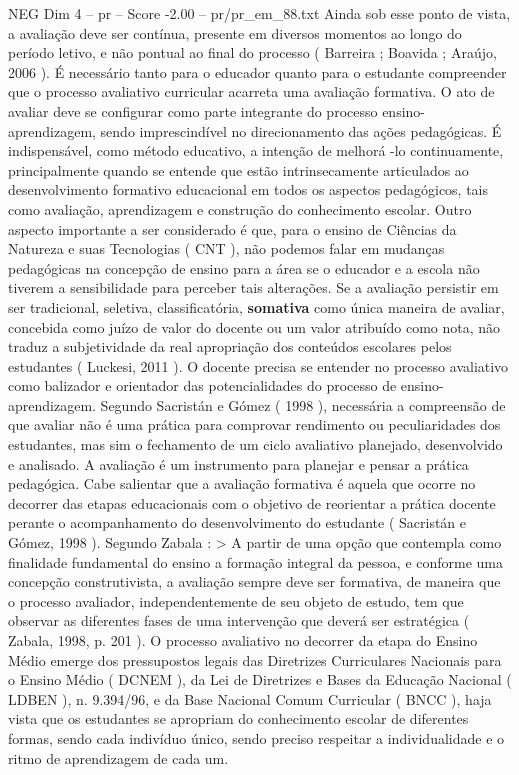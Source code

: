 \begin{textsample}{NEG Dim 4 – pr – Score -2.00 – pr/pr\_em\_88.txt}
Ainda sob esse ponto de vista, a avaliação deve ser contínua, presente em diversos momentos ao longo do período letivo, e não pontual ao final do processo ( Barreira ; Boavida ; Araújo, 2006 ).
É necessário tanto para o educador quanto para o estudante compreender que o processo avaliativo curricular acarreta uma avaliação formativa.
O ato de avaliar deve se configurar como parte integrante do processo ensino-aprendizagem, sendo imprescindível no direcionamento das ações pedagógicas.
É indispensável, como método educativo, a intenção de melhorá -lo continuamente, principalmente quando se entende que estão intrinsecamente articulados ao desenvolvimento formativo educacional em todos os aspectos pedagógicos, tais como avaliação, aprendizagem e construção do conhecimento escolar.
Outro aspecto importante a ser considerado é que, para o ensino de Ciências da Natureza e suas Tecnologias ( CNT ), não podemos falar em mudanças pedagógicas na concepção de ensino para a área se o educador e a escola não tiverem a sensibilidade para perceber tais alterações.
Se a avaliação persistir em ser tradicional, seletiva, classificatória, \textbf{somativa} como única maneira de avaliar, concebida como juízo de valor do docente ou um valor atribuído como nota, não traduz a subjetividade da real apropriação dos conteúdos escolares pelos estudantes ( Luckesi, 2011 ).
O docente precisa se entender no processo avaliativo como balizador e orientador das potencialidades do processo de ensino-aprendizagem.
Segundo Sacristán e Gómez ( 1998 ), necessária a compreensão de que avaliar não é uma prática para comprovar rendimento ou peculiaridades dos estudantes, mas sim o fechamento de um ciclo avaliativo planejado, desenvolvido e analisado.
A avaliação é um instrumento para planejar e pensar a prática pedagógica.
Cabe salientar que a avaliação formativa é aquela que ocorre no decorrer das etapas educacionais com o objetivo de reorientar a prática docente perante o acompanhamento do desenvolvimento do estudante ( Sacristán e Gómez, 1998 ).
Segundo Zabala : > A partir de uma opção que contempla como finalidade fundamental do ensino a formação integral da pessoa, e conforme uma concepção construtivista, a avaliação sempre deve ser formativa, de maneira que o processo avaliador, independentemente de seu objeto de estudo, tem que observar as diferentes fases de uma intervenção que deverá ser estratégica ( Zabala, 1998, p. 201 ).
O processo avaliativo no decorrer da etapa do Ensino Médio emerge dos pressupostos legais das Diretrizes Curriculares Nacionais para o Ensino Médio ( DCNEM ), da Lei de Diretrizes e Bases da Educação Nacional ( LDBEN ), n. 9.394/96, e da Base Nacional Comum Curricular ( BNCC ), haja vista que os estudantes se apropriam do conhecimento escolar de diferentes formas, sendo cada indivíduo único, sendo preciso respeitar a individualidade e o ritmo de aprendizagem de cada um.

\end{textsample}
